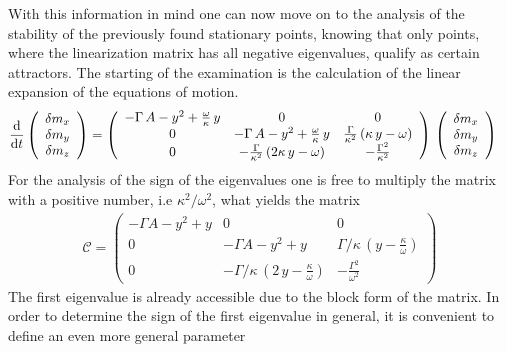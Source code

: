 With this information in mind one can now move on to the analysis of the stability of the previously found stationary points, knowing that only points, where the linearization matrix has all negative eigenvalues, qualify as certain attractors. The starting of the examination is the calculation of the linear expansion of the equations of motion.
\begin{align*}
    \frac{\text{d}}{\text{d}t}\left(\begin{array}{c}
         \delta m_x\\
         \delta m_y\\
         \delta m_z
    \end{array}\right)&=\left( \begin{array}{ccc}
        -\Gamma\,A-y^2+\frac{{\omega}}{{\kappa}}\,y&  0 & 0\\
        0 & -\Gamma\,A-y^2+\frac{{\omega}}{{\kappa}}\,y & \frac{\Gamma}{{\kappa}^2}\,({\kappa}\,y-{\omega})\\
        0 &  -\frac{\Gamma}{{\kappa}^2}\,(2{\kappa}\,y-{\omega}) & -\frac{\Gamma^2}{{\kappa}^2}
    \end{array} \right)\,\left(\begin{array}{c}
         \delta m_x\\
         \delta m_y\\
         \delta m_z
    \end{array}\right)
\end{align*}
For the analysis of the sign of the eigenvalues one is free to multiply the matrix with a positive number, i.e ${\kappa}^2/{\omega}^2$, what yields the matrix
\begin{align*}
    \mathcal{C}=\left( \begin{array}{ccc}
        -\Gamma A-{y}^2+{y}&  0 & 0\\
        0 & -\Gamma A-{y}^2+{y}& \Gamma/{\kappa}\,({y}-\frac{{\kappa}}{{\omega}})\\
        0 &  -\Gamma/{\kappa}\,(2\,{y}-\frac{{\kappa}}{{\omega}}) & -\frac{\Gamma^2}{{\omega}^2}
    \end{array} \right)
\end{align*}
The first eigenvalue is already accessible due to the block form of the matrix. In order to determine the sign of the first eigenvalue in general, it is convenient to define an even more general parameter
